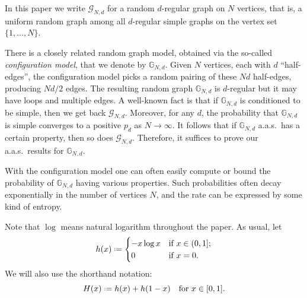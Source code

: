 \documentclass[12pt]{amsart}
\theoremstyle{definition}
\newcommand\Gb{\mathbb{G}}
\newcommand\Gc{\mathcal{G}}
\newcommand{\defeq}{\mathrel{\vcenter{\baselineskip0.5ex \lineskiplimit0pt
                     \hbox{\scriptsize.}\hbox{\scriptsize.}}}%
                     =}
\begin{document}
In this paper we write $\Gc_{N,d}$ for a random $d$-regular graph on $N$ vertices, that is, a uniform random graph among all $d$-regular simple graphs on the vertex set $\{1,\ldots,N\}$. 

There is a closely related random graph model, obtained via the so-called \emph{configuration model}, that we denote by $\Gb_{N,d}$. Given $N$ vertices, each with $d$ ``half-edges'', the configuration model picks a random pairing of these $Nd$ half-edges, producing $Nd/2$ edges. The resulting random graph $\Gb_{N,d}$ is $d$-regular but it may have loops and multiple edges. A well-known fact is that if $\Gb_{N,d}$ is conditioned to be simple, then we get back $\Gc_{N,d}$. Moreover, for any $d$, the probability that $\Gb_{N,d}$ is simple converges to a positive $p_d$ as $N \to \infty$. It follows that if $\Gb_{N,d}$ a.a.s.~has a certain property, then so does $\Gc_{N,d}$. Therefore, it suffices to prove our a.a.s.~results for $\Gb_{N,d}$.

With the configuration model one can often easily compute or bound the probability of $\Gb_{N,d}$ having various properties. Such probabilities often decay exponentially in the number of vertices $N$, and the rate can be expressed by some kind of entropy.


Note that $\log$ means natural logarithm throughout the paper. As usual, let 
%
\[ h(x) \defeq 
\begin{cases} 
-x \log x  & \text{if } x\in (0,1]; \\
0 & \text{if } x=0 .
\end{cases} \]
%
We will also use the shorthand notation: 
%
\[ H(x) \defeq h(x)+h(1-x) \quad 
\text{for } x \in [0,1] .\]
%
%
%
\end{document}
